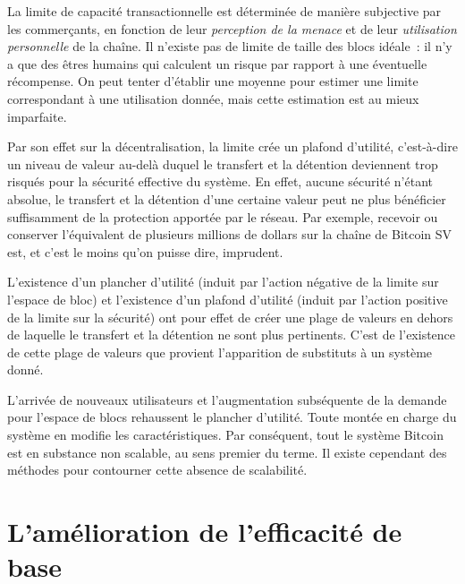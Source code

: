 La limite de capacité transactionnelle est déterminée de manière subjective par les commerçants, en fonction de leur \emph{perception de la menace} et de leur \emph{utilisation personnelle} de la chaîne. Il n'existe pas de limite de taille des blocs idéale~: il n'y a que des êtres humains qui calculent un risque par rapport à une éventuelle récompense. On peut tenter d'établir une moyenne pour estimer une limite correspondant à une utilisation donnée, mais cette estimation est au mieux imparfaite.

Par son effet sur la décentralisation, la limite crée un plafond d'utilité, c'est-à-dire un niveau de valeur au-delà duquel le transfert et la détention deviennent trop risqués pour la sécurité effective du système. En effet, aucune sécurité n'étant absolue, le transfert et la détention d'une certaine valeur peut ne plus bénéficier suffisamment de la protection apportée par le réseau. Par exemple, recevoir ou conserver l'équivalent de plusieurs millions de dollars sur la chaîne de Bitcoin SV est, et c'est le moins qu'on puisse dire, imprudent.

L'existence d'un plancher d'utilité (induit par l'action négative de la limite sur l'espace de bloc) et l'existence d'un plafond d'utilité (induit par l'action positive de la limite sur la sécurité) ont pour effet de créer une plage de valeurs en dehors de laquelle le transfert et la détention ne sont plus pertinents. C'est de l'existence de cette plage de valeurs que provient l'apparition de substituts à un système donné.

L'arrivée de nouveaux utilisateurs et l'augmentation subséquente de la demande pour l'espace de blocs rehaussent le plancher d'utilité. Toute montée en charge du système en modifie les caractéristiques. Par conséquent, tout le système Bitcoin est en substance non scalable, au sens premier du terme. Il existe cependant des méthodes pour contourner cette absence de scalabilité.

\section*{L'amélioration de l'efficacité de base}

